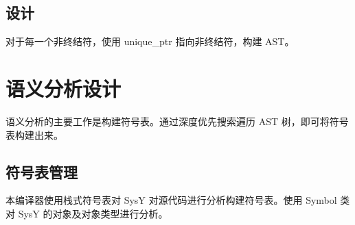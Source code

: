 \documentclass[a4paper]{article}
\begin{document}
		\subsection{设计}
		
			对于每一个非终结符，使用 unique\_ptr 指向非终结符，构建 AST。
			
	\section{语义分析设计}
	
		语义分析的主要工作是构建符号表。通过深度优先搜索遍历 AST 树，即可将符号表构建出来。

		\subsection{符号表管理}

		    本编译器使用栈式符号表对 SysY 对源代码进行分析构建符号表。使用 Symbol 类对 SysY 的对象及对象类型进行分析。

	
	
	
	
	
	
\end{document}

